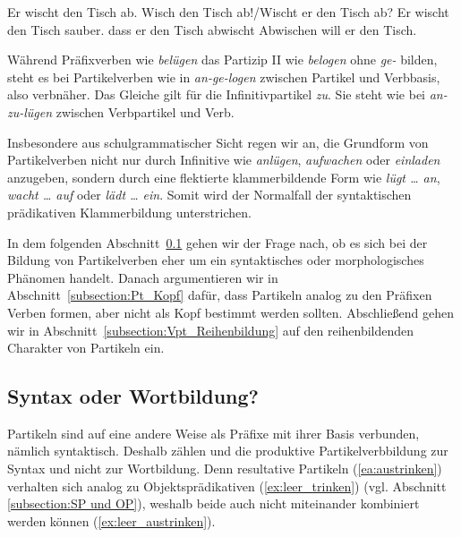 \ea \label{ea:Stellung_VPt}
\ea \label{ea:Trennung1} Er wischt den Tisch ab.
\ex \label{ex:Trennung2} Wisch den Tisch ab!/Wischt er den Tisch ab?
\ex \label{ex:Trennung3} Er wischt den Tisch sauber.
\ex \label{ex:Adjazenz1} dass er den Tisch abwischt
\ex \label{ex:Adjazenz2} Abwischen will er den Tisch.
\z 
\z 

Während Präfixverben wie \textit{belügen} das Partizip II wie \textit{belogen} ohne \textit{ge-} bilden, steht es bei Partikelverben wie in \textit{an-ge-logen} zwischen Partikel und Verbbasis, also verbnäher. Das Gleiche gilt für die Infinitivpartikel \textit{zu}. Sie steht wie bei \textit{an-zu-lügen} zwischen Verbpartikel und Verb.

Insbesondere aus schulgrammatischer Sicht regen wir an, die Grundform von Partikelverben nicht nur durch Infinitive wie \textit{anlügen}, \textit{aufwachen} oder \textit{einladen} anzugeben, sondern durch eine flektierte klammerbildende Form wie \zB \textit{lügt \ldots{} an}, \textit{wacht \ldots{} auf} oder \textit{lädt \ldots{} ein}. Somit wird der Normalfall der syntaktischen prädikativen Klammerbildung unterstrichen. 

In dem folgenden Abschnitt~\ref{subsection:Vpt_Syntax_Wortbildung} gehen wir der Frage nach, ob es sich bei der Bildung von Partikelverben eher um ein syntaktisches oder morphologisches Phänomen handelt. Danach argumentieren wir in Abschnitt~\ref{subsection:Pt_Kopf} dafür, dass Partikeln analog zu den Präfixen Verben formen, aber nicht als Kopf bestimmt werden sollten. Abschließend gehen wir in Abschnitt~\ref{subsection:Vpt_Reihenbildung} auf den reihenbildenden Charakter von Partikeln ein.


\subsection{Syntax oder Wortbildung?}\label{subsection:Vpt_Syntax_Wortbildung}

Partikeln sind auf eine andere Weise als Präfixe mit ihrer Basis verbunden, nämlich syntaktisch. Deshalb zählen \ua \citet{Luedeling2001} und \citet{Mueller2002} die produktive Partikelverbbildung zur Syntax und nicht zur Wortbildung. Denn resultative Partikeln (\ref{ea:austrinken}) verhalten sich analog zu Objektsprädikativen (\ref{ex:leer_trinken}) (vgl. Abschnitt \ref{subsection:SP und OP}), weshalb beide auch nicht miteinander kombiniert werden können (\ref{ex:leer_austrinken}).

\ea \label{ea:OP_VPart}
\label{ea:austrinken}
\label{ex:leer_trinken}
\label{ex:leer_austrinken}
\z 
\z 

